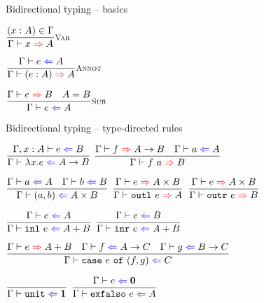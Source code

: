 \documentclass{beamer}
\newcommand{\Fun}[2]{#1 \to #2}
\newcommand{\Prod}[2]{#1 \times #2}
\newcommand{\Sum}[2]{#1 + #2}
\newcommand{\Unit}{\textbf{1}}
\newcommand{\Empty}{\textbf{0}}
\newcommand{\annot}[2]{(#1 : #2)}
\newcommand{\fun}[2]{\lambda #1. #2}
\newcommand{\app}[2]{#1\ #2}
\newcommand{\pair}[2]{(#1, #2)}
\newcommand{\outl}[1]{\texttt{outl}\ #1}
\newcommand{\outr}[1]{\texttt{outr}\ #1}
\newcommand{\inl}[1]{\texttt{inl}\ #1}
\newcommand{\inr}[1]{\texttt{inr}\ #1}
\newcommand{\case}[3]{\texttt{case}\ #1\ \texttt{of}\ (#2, #3)}
\newcommand{\unit}{\texttt{unit}}
\newcommand{\exfalso}[1]{\texttt{exfalso}\ #1}
\newcommand{\rulename}[1]{\textsc{\footnotesize{#1}}}
\newcommand{\infrule}[3][]{\displaystyle \frac{#2}{#3} \rulename{#1}}
\newcommand{\extend}[3]{#1, #2 : #3}
\newcommand{\sidecond}[1]{#1}
\begin{document}
\begin{frame}{Bidirectional typing -- basics}

\begin{center}
  $\infrule[Var]{\sidecond{(x : A) \in \Gamma}}{\infer{x}{A}}$

  \vspace{2em}

  $\infrule[Annot]{\check{e}{A}}{\infer{\annot{e}{A}}{A}}$

  \vspace{2em}

  $\infrule[Sub]{\infer{e}{B} \quad \sidecond{A = B}}{\check{e}{A}}$
\end{center}

\end{frame}

\begin{frame}{Bidirectional typing -- type-directed rules}

\begin{center}
  $\infrule{\fullcheck{\extend{\Gamma}{x}{A}}{e}{B}}{\check{\fun{x}{e}}{\Fun{A}{B}}}$ \quad
  $\infrule{\infer{f}{\Fun{A}{B}} \quad \check{a}{A}}{\infer{\app{f}{a}}{B}}$

  \vspace{2em}

  $\infrule{\check{a}{A} \quad \check{b}{B}}{\check{\pair{a}{b}}{\Prod{A}{B}}}$ \quad
  $\infrule{\infer{e}{\Prod{A}{B}}}{\infer{\outl{e}}{A}}$ \quad
  $\infrule{\infer{e}{\Prod{A}{B}}}{\infer{\outr{e}}{B}}$

  \vspace{2em}

  $\infrule{\check{e}{A}}{\check{\inl{e}}{\Sum{A}{B}}}$ \quad
  $\infrule{\check{e}{B}}{\check{\inr{e}}{\Sum{A}{B}}}$

  \vspace{2em}

  $\infrule{\infer{e}{\Sum{A}{B}} \quad \check{f}{\Fun{A}{C}} \quad \check{g}{\Fun{B}{C}}}{\check{\case{e}{f}{g}}{C}}$

  \vspace{2em}

  $\infrule{}{\check{\unit}{\Unit}}$ \quad
  $\infrule{\check{e}{\Empty}}{\check{\exfalso{e}}{A}}$
\end{center}

\end{frame}
\end{document}
